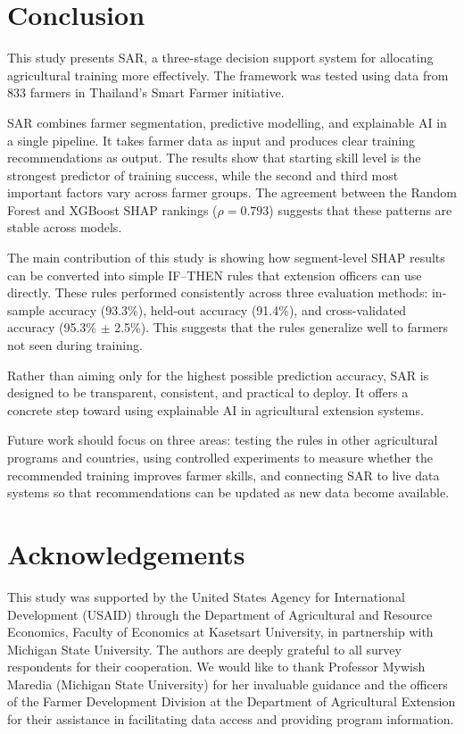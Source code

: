 \documentclass[fleqn,10pt,lineno]{wlpeerj}
\begin{document}
\section{Conclusion}

This study presents SAR, a three-stage decision support system for allocating agricultural training more effectively. The framework was tested using data from 833 farmers in Thailand's Smart Farmer initiative.

SAR combines farmer segmentation, predictive modelling, and explainable AI in a single pipeline. It takes farmer data as input and produces clear training recommendations as output. The results show that starting skill level is the strongest predictor of training success, while the second and third most important factors vary across farmer groups. The agreement between the Random Forest and XGBoost SHAP rankings ($\rho = 0.793$) suggests that these patterns are stable across models.

The main contribution of this study is showing how segment-level SHAP results can be converted into simple IF--THEN rules that extension officers can use directly. These rules performed consistently across three evaluation methods: in-sample accuracy (93.3\%), held-out accuracy (91.4\%), and cross-validated accuracy (95.3\% $\pm$ 2.5\%). This suggests that the rules generalize well to farmers not seen during training.

Rather than aiming only for the highest possible prediction accuracy, SAR is designed to be transparent, consistent, and practical to deploy. It offers a concrete step toward using explainable AI in agricultural extension systems.

Future work should focus on three areas: testing the rules in other agricultural programs and countries, using controlled experiments to measure whether the recommended training improves farmer skills, and connecting SAR to live data systems so that recommendations can be updated as new data become available.

\section*{Acknowledgements}
This study was supported by the United States Agency for International Development (USAID) through the Department of Agricultural and Resource Economics, Faculty of Economics at Kasetsart University, in partnership with Michigan State University. The authors are deeply grateful to all survey respondents for their cooperation. We would like to thank Professor Mywish Maredia (Michigan State University) for her invaluable guidance and the officers of the Farmer Development Division at the Department of Agricultural Extension for their assistance in facilitating data access and providing program information. 
\end{document}
